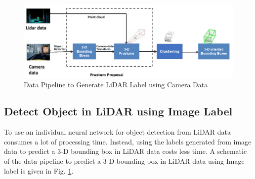 \begin{figure}
    \centering
    \includegraphics[scale= 0.35]{Images/LiDARlabel.png}
    \caption{Data Pipeline to Generate LiDAR Label using Camera Data \cite{MATLAB_Lidar}}
    \label{lidarlabel}
\end{figure}

\subsection{Detect Object in LiDAR using Image Label}
To use an individual neural network for object detection from LiDAR data consumes a lot of processing time. Instead, using the labels generated from image data to predict a 3-D bounding box in LiDAR data costs less time. A schematic of the data pipeline to predict a 3-D bounding box in LiDAR data using Image label is given in Fig. \ref{lidarlabel}.     

